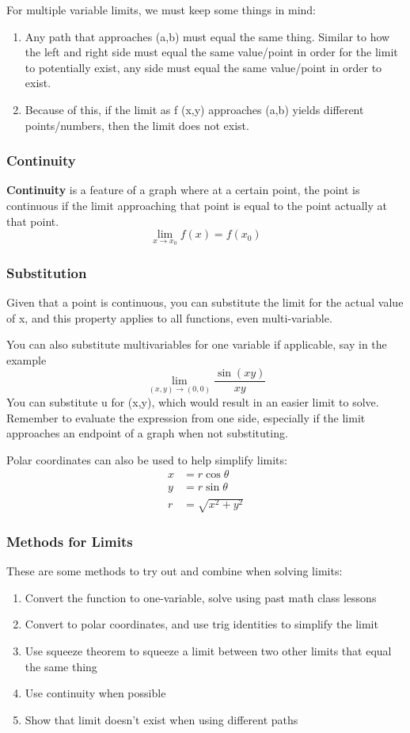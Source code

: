 \documentclass{article}
\begin{document}
For multiple variable limits, we must keep some things in mind:
\begin{enumerate}
    \item Any path that approaches (a,b) must equal the same thing. Similar to how the left and right side must equal the same
value/point in order for the limit to potentially exist, any side must equal the same value/point in order to exist.
    \item Because of this, if the limit as f (x,y) approaches (a,b) yields different points/numbers, then the limit does not exist.
\end{enumerate}

\subsubsection{Continuity}
\textbf{Continuity} is a feature of a graph where at a certain point, the point is continuous if
the limit approaching that point is equal to the point actually at that point.
\[
  \lim_{x\rightarrow x_0} f(x) = f(x_0)
\]

\subsubsection{Substitution}
Given that a point is continuous, you can substitute the limit for the actual value of x,
and this property applies to all functions, even multi-variable.\newline

You can also substitute multivariables for one variable if applicable, say in the example
\[
  \lim_{(x,y)\rightarrow(0,0)} \frac{\sin(xy)}{xy}
\]
You can substitute u for (x,y), which would result in an easier limit to solve.
Remember to evaluate the expression from one side, especially if the limit approaches an endpoint of a graph when not substituting.\newline

Polar coordinates can also be used to help simplify limits:
\begin{align}
  x &= r\cos{\theta}\\
  y &= r\sin{\theta}\\
  r &= \sqrt{x^2 + y^2} 
\end{align}
\subsubsection{Methods for Limits}
These are some methods to try out and combine when solving limits:
\begin{enumerate}
    \item Convert the function to one-variable, solve using past math class lessons
    \item Convert to polar coordinates, and use trig identities to simplify the limit
    \item Use squeeze theorem to squeeze a limit between two other limits that equal the same thing
    \item Use continuity when possible
    \item Show that limit doesn't exist when using different paths
\end{enumerate}
\end{document}
